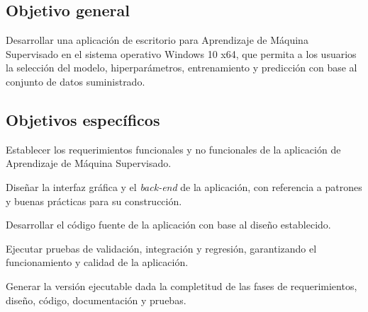 \subsection{Objetivo general}
Desarrollar una aplicación de escritorio para Aprendizaje de Máquina Supervisado en el sistema operativo Windows 10 x64, que permita a los usuarios la selección del modelo, hiperparámetros, entrenamiento y predicción con base al conjunto de datos suministrado. 

\subsection{Objetivos específicos}
\begin{APAitemize}
    \item Establecer los requerimientos funcionales y no funcionales de la aplicación de Aprendizaje de Máquina Supervisado.
    \item Diseñar la interfaz gráfica y el \textit{back-end} de la aplicación, con referencia a patrones y buenas prácticas para su construcción.
    \item Desarrollar el código fuente de la aplicación con base al diseño establecido. 
    \item Ejecutar pruebas de validación, integración y regresión, garantizando el funcionamiento y calidad de la aplicación.
    \item Generar la versión ejecutable dada la completitud de las fases de requerimientos, diseño, código, documentación y pruebas.
\end{APAitemize}



